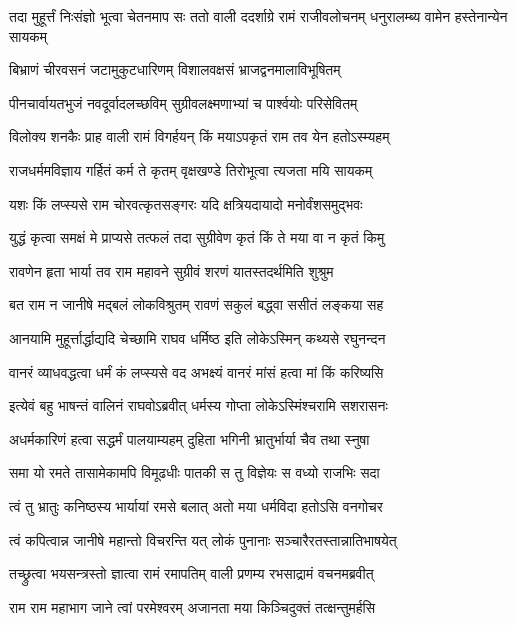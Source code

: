 \threelineshloka
{तदा मुहूर्त्तं निःसंज्ञो भूत्वा चेतनमाप सः}
{ततो वाली ददर्शाग्रे रामं राजीवलोचनम्}
{धनुरालम्ब्य वामेन हस्तेनान्येन सायकम्} %

\twolineshloka
{बिभ्राणं चीरवसनं जटामुकुटधारिणम्}
{विशालवक्षसं भ्राजद्वनमालाविभूषितम्} %

\twolineshloka
{पीनचार्वायतभुजं नवदूर्वादलच्छविम्}
{सुग्रीवलक्ष्मणाभ्यां च पार्श्वयोः परिसेवितम्} %

\twolineshloka
{विलोक्य शनकैः प्राह वाली रामं विगर्हयन्}
{किं मयाऽपकृतं राम तव येन हतोऽस्म्यहम्} %

\twolineshloka
{राजधर्ममविज्ञाय गर्हितं कर्म ते कृतम्}
{वृक्षखण्डे तिरोभूत्वा त्यजता मयि सायकम्} %

\twolineshloka
{यशः किं लप्स्यसे राम चोरवत्कृतसङ्गरः}
{यदि क्षत्रियदायादो मनोर्वंशसमुद्भवः} %

\twolineshloka
{युद्धं कृत्वा समक्षं मे प्राप्यसे तत्फलं तदा}
{सुग्रीवेण कृतं किं ते मया वा न कृतं किमु} %

\twolineshloka
{रावणेन हृता भार्या तव राम महावने}
{सुग्रीवं शरणं यातस्तदर्थमिति शुश्रुम} %

\twolineshloka
{बत राम न जानीषे मद्बलं लोकविश्रुतम्}
{रावणं सकुलं बद्ध्वा ससीतं लङ्कया सह} %

\twolineshloka
{आनयामि मुहूर्त्तार्द्धाद्यदि चेच्छामि राघव}
{धर्मिष्ठ इति लोकेऽस्मिन् कथ्यसे रघुनन्दन} %

\twolineshloka
{वानरं व्याधवद्धत्वा धर्मं कं लप्स्यसे वद}
{अभक्ष्यं वानरं मांसं हत्वा मां किं करिष्यसि} %

\twolineshloka
{इत्येवं बहु भाषन्तं वालिनं राघवोऽब्रवीत्}
{धर्मस्य गोप्ता लोकेऽस्मिंश्चरामि सशरासनः} %

\twolineshloka
{अधर्मकारिणं हत्वा सद्धर्मं पालयाम्यहम्}
{दुहिता भगिनी भ्रातुर्भार्या चैव तथा स्नुषा} %

\twolineshloka
{समा यो रमते तासामेकामपि विमूढधीः}
{पातकी स तु विज्ञेयः स वध्यो राजभिः सदा} %

\twolineshloka
{त्वं तु भ्रातुः कनिष्ठस्य भार्यायां रमसे बलात्}
{अतो मया धर्मविदा हतोऽसि वनगोचर} %

\twolineshloka
{त्वं कपित्वान्न जानीषे महान्तो विचरन्ति यत्}
{लोकं पुनानाः सञ्चारैरतस्तान्नातिभाषयेत्} %

\twolineshloka
{तच्छ्रुत्वा भयसन्त्रस्तो ज्ञात्वा रामं रमापतिम्}
{वाली प्रणम्य रभसाद्रामं वचनमब्रवीत्} %

\twolineshloka
{राम राम महाभाग जाने त्वां परमेश्वरम्}
{अजानता मया किञ्चिदुक्तं तत्क्षन्तुमर्हसि} %

